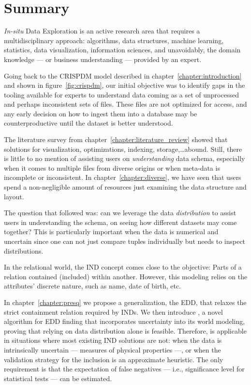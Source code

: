 \glsresetall

\section{Summary}

\emph{In-situ} Data Exploration is an active research area that requires
a multidisciplinary approach: algorithms, data structures, machine learning,
statistics,  data visualization, information sciences, and unavoidably,
the domain knowledge --- or business understanding ---  provided by an expert.

Going back to the \gls{CRISPDM} model described in  chapter~\ref{chapter:introduction}
and shown in figure~\ref{fig:crispdm}, our initial objective was to identify
gaps in the tooling available for experts to understand data coming as a set of
unprocessed and perhaps inconsistent sets of files. These files are not optimized
for access, and any early decision on how to ingest them into a database may be
counterproductive until the dataset is better understood.

The literature survey from chapter~\ref{chapter:literature_review} showed that
solutions for visualization, optimizations, indexing, storage,\ldots abound.
Still, there is little to no mention of assisting users on \emph{understanding}
data schema, especially when it comes to multiple files from diverse origins or
when meta-data is incomplete or inconsistent.
In chapter~\ref{chapter:diverse}, we have seen that users spend a non-negligible
amount of resources just examining the data structure and layout.

The question that followed was: can we leverage the data \emph{distribution} to
assist users in understanding the schema, on seeing how different datasets may come together?
This is particularly important when the data is numerical and uncertain since
one can not just compare tuples individually but needs to inspect distributions.

In the relational world, the \gls{IND} concept comes close to the objective:
Parts of a relation contained (included) within another. However, this modeling
relies on the attributes' discrete nature, such as name, date of birth, etc.

In chapter~\ref{chapter:presq} we propose a generalization, the \gls{EDD}, that
relaxes the strict containment relation required by \glspl{IND}.
We then introduce \PresQ, a novel algorithm for \gls{EDD} finding that incorporates
uncertainty into its world modeling, proving that relying on data distribution alone is feasible.
Therefore, \PresQ is applicable in situations where most existing \gls{IND} solutions
are not: when the data is intrinsically uncertain --- measures of physical properties ---,
or when the validation strategy for the inclusion is an approximate heuristic.
The only requirement is that the expectation of false negatives --- i.e., significance
level for statistical tests --- can be estimated.

